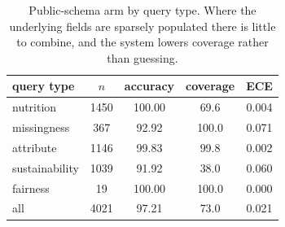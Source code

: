 \begin{table}[t]
\caption{Public-schema arm by query type. Where the underlying fields are sparsely populated there is little to combine, and the system lowers coverage rather than guessing.}
\label{tab:off}
\centering\footnotesize
\setlength{\tabcolsep}{4.5pt}
\begin{tabular}{lcccc}
\toprule
query type & $n$ & accuracy & coverage & ECE \\
\midrule
nutrition & 1450 & 100.00 & 69.6 & 0.004 \\
missingness & 367 & 92.92 & 100.0 & 0.071 \\
attribute & 1146 & 99.83 & 99.8 & 0.002 \\
sustainability & 1039 & 91.92 & 38.0 & 0.060 \\
fairness & 19 & 100.00 & 100.0 & 0.000 \\
\midrule
all & 4021 & 97.21 & 73.0 & 0.021 \\
\bottomrule
\end{tabular}
\end{table}
